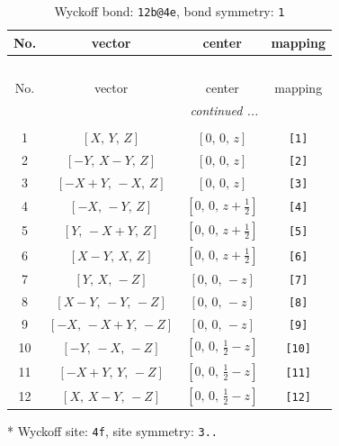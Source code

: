 \documentclass[fleqn,8pt]{jsarticle}
\begin{document}
\begin{longtable}{cccc}
\caption{Wyckoff bond: {\tt 12b@4e}, bond symmetry: {\tt 1}}
 \\
 \hline \hline
No. & vector & center & mapping \\ \hline \endfirsthead

\multicolumn{3}{l}{\tablename\ \thetable{}} \\
 \hline \hline
No. & vector & center & mapping \\ \hline \endhead

 \hline \hline
\multicolumn{3}{r}{\footnotesize\it continued ...} \\ \endfoot

 \hline \hline
\multicolumn{3}{r}{} \\ \endlastfoot

1 & $\left[ X,\, Y,\, Z \right]$ & $\left[ 0,\, 0,\, z \right]$ & {\tt [1]} \\ \hline
2 & $\left[ - Y,\, X - Y,\, Z \right]$ & $\left[ 0,\, 0,\, z \right]$ & {\tt [2]} \\ \hline
3 & $\left[ - X + Y,\, - X,\, Z \right]$ & $\left[ 0,\, 0,\, z \right]$ & {\tt [3]} \\ \hline
4 & $\left[ - X,\, - Y,\, Z \right]$ & $\left[ 0,\, 0,\, z + \frac{1}{2} \right]$ & {\tt [4]} \\ \hline
5 & $\left[ Y,\, - X + Y,\, Z \right]$ & $\left[ 0,\, 0,\, z + \frac{1}{2} \right]$ & {\tt [5]} \\ \hline
6 & $\left[ X - Y,\, X,\, Z \right]$ & $\left[ 0,\, 0,\, z + \frac{1}{2} \right]$ & {\tt [6]} \\ \hline
7 & $\left[ Y,\, X,\, - Z \right]$ & $\left[ 0,\, 0,\, - z \right]$ & {\tt [7]} \\ \hline
8 & $\left[ X - Y,\, - Y,\, - Z \right]$ & $\left[ 0,\, 0,\, - z \right]$ & {\tt [8]} \\ \hline
9 & $\left[ - X,\, - X + Y,\, - Z \right]$ & $\left[ 0,\, 0,\, - z \right]$ & {\tt [9]} \\ \hline
10 & $\left[ - Y,\, - X,\, - Z \right]$ & $\left[ 0,\, 0,\, \frac{1}{2} - z \right]$ & {\tt [10]} \\ \hline
11 & $\left[ - X + Y,\, Y,\, - Z \right]$ & $\left[ 0,\, 0,\, \frac{1}{2} - z \right]$ & {\tt [11]} \\ \hline
12 & $\left[ X,\, X - Y,\, - Z \right]$ & $\left[ 0,\, 0,\, \frac{1}{2} - z \right]$ & {\tt [12]} \\
\end{longtable}
* Wyckoff site: {\tt 4f}, site symmetry: {\tt 3..}
\end{document}
